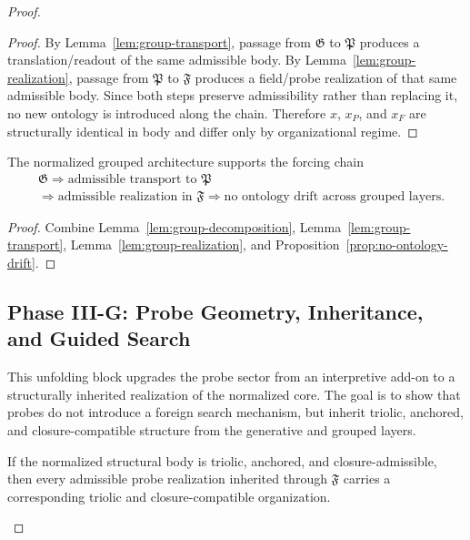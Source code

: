 \begin{proof}
\begin{proof}
By Lemma~\ref{lem:group-transport}, passage from $\mathfrak G$ to $\mathfrak P$
produces a translation/readout of the same admissible body. By
Lemma~\ref{lem:group-realization}, passage from $\mathfrak P$ to $\mathfrak F$
produces a field/probe realization of that same admissible body. Since both
steps preserve admissibility rather than replacing it, no new ontology is
introduced along the chain. Therefore $x$, $x_P$, and $x_F$ are structurally
identical in body and differ only by organizational regime.
\end{proof}

\begin{corollary}
\label{cor:first-grouped-transport-forcing-chain}
The normalized grouped architecture supports the forcing chain
\[
\begin{aligned}
&\mathfrak G \Longrightarrow \text{admissible transport to }\mathfrak P\\
&\Longrightarrow \text{admissible realization in }\mathfrak F \Longrightarrow \text{no ontology drift across grouped layers}.
\end{aligned}
\]
\end{corollary}

\begin{proof}
Combine Lemma~\ref{lem:group-decomposition}, Lemma~\ref{lem:group-transport},
Lemma~\ref{lem:group-realization}, and
Proposition~\ref{prop:no-ontology-drift}.
\end{proof}


\subsection*{Phase III-G: Probe Geometry, Inheritance, and Guided Search}

This unfolding block upgrades the probe sector from an interpretive add-on to a
structurally inherited realization of the normalized core. The goal is to show
that probes do not introduce a foreign search mechanism, but inherit triolic,
anchored, and closure-compatible structure from the generative and grouped
layers.

\begin{lemma}
\label{lem:probe-inheritance}
If the normalized structural body is triolic, anchored, and closure-admissible,
then every admissible probe realization inherited through $\mathfrak F$ carries a
corresponding triolic and closure-compatible organization.
\end{lemma}


\end{proof}
